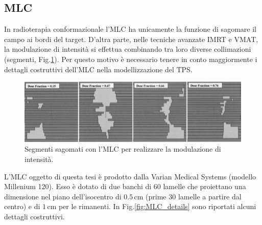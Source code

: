 \subsection{MLC}
In radioterapia conformazionale l'MLC ha unicamente la funzione di sagomare il campo ai bordi del target. D'altra parte, nelle tecniche avanzate IMRT e VMAT, la modulazione di intensità si effettua combinando tra loro diverse collimazioni (segmenti, Fig.\ref{fig:IMRT_Segments}). Per questo motivo è necessario tenere in conto maggiormente i dettagli costruttivi dell'MLC nella modellizzazione del TPS.

\begin{figure}
\centering
\includegraphics[width=\textwidth]{./cap2/IMRT_Segments_2.jpg}
\caption{Segmenti sagomati con l'MLC per realizzare la modulazione di intensità.}
\label{fig:IMRT_Segments}
\end{figure}

L'MLC oggetto di questa tesi è prodotto dalla Varian Medical Systems (modello Millenium 120). Esso è dotato di due banchi di 60 lamelle che proiettano una dimensione nel piano dell'isocentro di $0.5\,$cm (prime 30 lamelle a partire dal centro) e di $1\,$cm per le rimanenti. In Fig.\ref{fig:MLC_details} sono riportati alcuni dettagli costruttivi.


